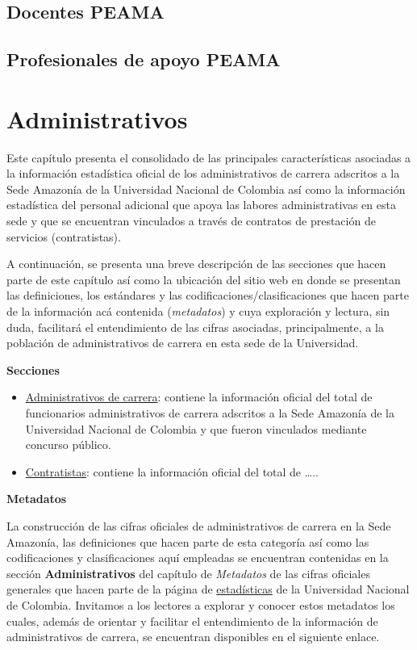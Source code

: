 \documentclass[
]{book}
\begin{document}
\hypertarget{DocPEAMA}{%
\section{Docentes PEAMA}\label{DocPEAMA}}

\hypertarget{DocApo}{%
\section{Profesionales de apoyo PEAMA}\label{DocApo}}

\hypertarget{Admi}{%
\chapter{Administrativos}\label{Admi}}

Este capítulo presenta el consolidado de las principales características asociadas a la información estadística oficial de los administrativos de carrera adscritos a la Sede Amazonía de la Universidad Nacional de Colombia así como la información estadística del personal adicional que apoya las labores administrativas en esta sede y que se encuentran vinculados a través de contratos de prestación de servicios (contratistas).

A continuación, se presenta una breve descripción de las secciones que hacen parte de este capítulo así como la ubicación del sitio web en donde se presentan las definiciones, los estándares y las codificaciones/clasificaciones que hacen parte de la información acá contenida (\emph{metadatos}) y cuya exploración y lectura, sin duda, facilitará el entendimiento de las cifras asociadas, principalmente, a la población de administrativos de carrera en esta sede de la Universidad.

\textbf{Secciones}

\begin{itemize}
\item
  \protect\hyperlink{AdmCar}{Administrativos de carrera}: contiene la información oficial del total de funcionarios administrativos de carrera adscritos a la Sede Amazonía de la Universidad Nacional de Colombia y que fueron vinculados mediante concurso público.
\item
  \protect\hyperlink{Contrat}{Contratistas}: contiene la información oficial del total de \ldots..
\end{itemize}

\textbf{Metadatos}

La construcción de las cifras oficiales de administrativos de carrera en la Sede Amazonía, las definiciones que hacen parte de esta categoría así como las codificaciones y clasificaciones aquí empleadas se encuentran contenidas en la sección \textbf{Administrativos} del capítulo de \emph{Metadatos} de las cifras oficiales generales que hacen parte de la página de \href{http://estadisticas.unal.edu.co/home/}{estadísticas} de la Universidad Nacional de Colombia. Invitamos a los lectores a explorar y conocer estos metadatos los cuales, además de orientar y facilitar el entendimiento de la información de administrativos de carrera, se encuentran disponibles en el siguiente enlace.
\end{document}
